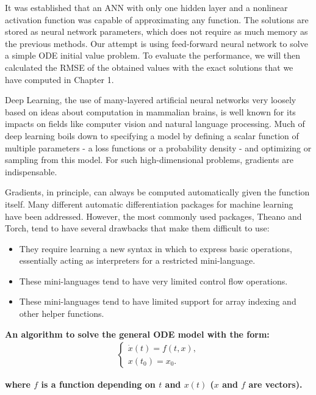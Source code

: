 \documentclass[a4paper]{article}
\numberwithin{equation}{section}
\begin{document}
It was established that an ANN with only one hidden layer and a nonlinear activation function was capable of approximating any function. The solutions are stored as neural network parameters, which does not require as much memory as the previous methods. Our attempt is using feed-forward neural network to solve a simple ODE initial value problem. To evaluate the performance, we will then calculated the RMSE of the obtained values with the exact solutions that we have computed in Chapter 1.

Deep Learning, the use of many-layered artificial neural networks very loosely based on ideas about computation in mammalian brains, is well known for its impacts on fields like computer vision and natural language processing.
Much of deep learning boils down to specifying a model by defining a scalar function of multiple parameters - a loss functions or a probability density - and optimizing or sampling from this model.
For such high-dimensional problems, gradients are indispensable.

Gradients, in principle, can always be computed automatically given the function itself.
Many different automatic differentiation packages for machine learning have been addressed.
However, the most commonly used packages, Theano\cite{bastien2012theano} and Torch\cite{collobert2002torch}, tend to have several drawbacks that make them difficult to use:
\begin{itemize}
  \item They require learning a new syntax in which to express basic operations, essentially acting as interpreters for a restricted mini-language.
  \item These mini-languages tend to have very limited control flow operations.
  \item These mini-languages tend to have limited support for array indexing and other helper functions.
\end{itemize}

\textbf{An algorithm to solve the general ODE model with the form:}
\begin{align*}
  \begin{cases}
    \dot{x}(t) = f(t, x), \\
    x(t_0) = x_0.
  \end{cases}
\end{align*}

\textbf{where \( f \) is a function depending on \( t \) and \( x(t) \) (\( x \) and \( f \) are vectors).}
\end{document}
